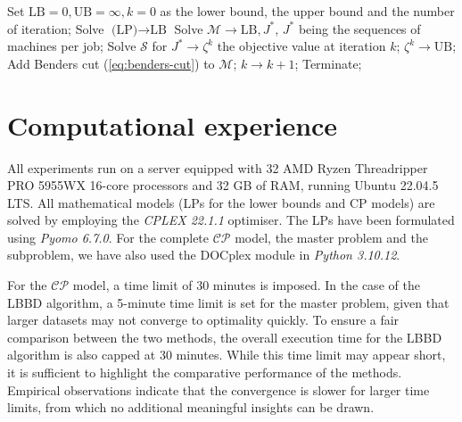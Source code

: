\documentclass[a4paper,final]{article}
\begin{document}
        \begin{algorithm}[H]
            \caption{CP-oriented Logic-Based Benders Decomposition}
            \label{alg:lbbd}
            \begin{algorithmic}[1]
                \State Set $\text{LB} = 0, \text{UB} = \infty, k = 0$ as the lower bound, the upper bound and the number of iteration;
                \State Solve $\text{(LP)}\rightarrow \text{LB}$
                    \State Solve $\mathcal{M}\rightarrow \text{LB}, J^*$, $J^*$ being the sequences of machines per job;
                    \State Solve $\mathcal{S}$ for $J^*\rightarrow \zeta^{k}$ the objective value at iteration $k$;
                        \State $\zeta^{k}\rightarrow \text{UB}$;
                    \EndIf
                    \State Add Benders cut (\ref{eq:benders-cut}) to $\mathcal{M}$;
                    \State $k\rightarrow k + 1$;
                \EndWhile
                \State Terminate;
            \end{algorithmic}
        \end{algorithm}

        
\section{Computational experience} \label{sec:experiments}
    All experiments run on a server equipped with 32 AMD Ryzen Threadripper PRO 5955WX 16-core processors and 32 GB of RAM, running Ubuntu 22.04.5 LTS. All mathematical models (LPs for the lower bounds and CP models) are solved by employing the \emph{CPLEX 22.1.1} optimiser. The LPs have been formulated using \emph{Pyomo 6.7.0}. For the complete $\mathcal{CP}$ model, the master problem and the subproblem, we have also used the 
    DOCplex module in \emph{Python 3.10.12}.

    For the $\mathcal{CP}$ model, a time limit of 30 minutes is imposed. In the case of the LBBD algorithm, a 5-minute time limit is set for the master problem, given that larger datasets may not converge to optimality quickly. To ensure a fair comparison between the two methods, the overall execution time for the LBBD algorithm is also capped at 30 minutes. While this time limit may appear short, it is sufficient to highlight the comparative performance of the methods. Empirical observations indicate that the convergence is slower for larger time limits, from which no additional meaningful insights can be drawn.  
    
\end{document}
